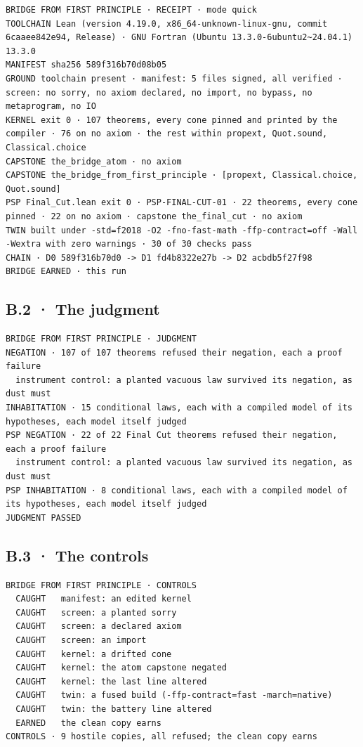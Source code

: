 \documentclass[10pt,twocolumn]{article}
\begin{document}
\begin{Verbatim}
BRIDGE FROM FIRST PRINCIPLE · RECEIPT · mode quick
TOOLCHAIN Lean (version 4.19.0, x86_64-unknown-linux-gnu, commit 6caaee842e94, Release) · GNU Fortran (Ubuntu 13.3.0-6ubuntu2~24.04.1) 13.3.0
MANIFEST sha256 589f316b70d08b05
GROUND toolchain present · manifest: 5 files signed, all verified · screen: no sorry, no axiom declared, no import, no bypass, no metaprogram, no IO
KERNEL exit 0 · 107 theorems, every cone pinned and printed by the compiler · 76 on no axiom · the rest within propext, Quot.sound, Classical.choice
CAPSTONE the_bridge_atom · no axiom
CAPSTONE the_bridge_from_first_principle · [propext, Classical.choice, Quot.sound]
PSP Final_Cut.lean exit 0 · PSP-FINAL-CUT-01 · 22 theorems, every cone pinned · 22 on no axiom · capstone the_final_cut · no axiom
TWIN built under -std=f2018 -O2 -fno-fast-math -ffp-contract=off -Wall -Wextra with zero warnings · 30 of 30 checks pass
CHAIN · D0 589f316b70d0 -> D1 fd4b8322e27b -> D2 acbdb5f27f98
BRIDGE EARNED · this run
\end{Verbatim}

\hypertarget{b.2-the-judgment}{%
\subsection{B.2 · The judgment}\label{b.2-the-judgment}}

\begin{Verbatim}
BRIDGE FROM FIRST PRINCIPLE · JUDGMENT
NEGATION · 107 of 107 theorems refused their negation, each a proof failure
  instrument control: a planted vacuous law survived its negation, as dust must
INHABITATION · 15 conditional laws, each with a compiled model of its hypotheses, each model itself judged
PSP NEGATION · 22 of 22 Final Cut theorems refused their negation, each a proof failure
  instrument control: a planted vacuous law survived its negation, as dust must
PSP INHABITATION · 8 conditional laws, each with a compiled model of its hypotheses, each model itself judged
JUDGMENT PASSED
\end{Verbatim}

\hypertarget{b.3-the-controls}{%
\subsection{B.3 · The controls}\label{b.3-the-controls}}

\begin{Verbatim}
BRIDGE FROM FIRST PRINCIPLE · CONTROLS
  CAUGHT   manifest: an edited kernel
  CAUGHT   screen: a planted sorry
  CAUGHT   screen: a declared axiom
  CAUGHT   screen: an import
  CAUGHT   kernel: a drifted cone
  CAUGHT   kernel: the atom capstone negated
  CAUGHT   kernel: the last line altered
  CAUGHT   twin: a fused build (-ffp-contract=fast -march=native)
  CAUGHT   twin: the battery line altered
  EARNED   the clean copy earns
CONTROLS · 9 hostile copies, all refused; the clean copy earns
\end{Verbatim}
\end{document}
